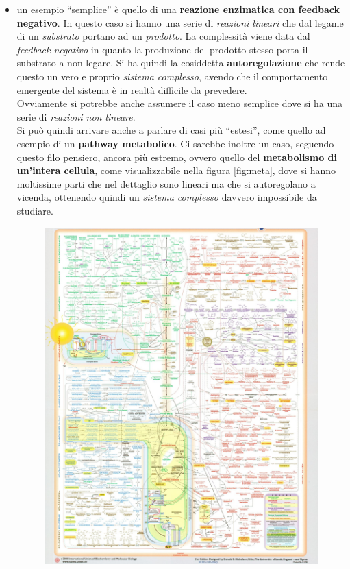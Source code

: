 \documentclass[a4paper,12pt, oneside]{book}
\begin{document}
\begin{itemize}
  \item un esempio ``semplice'' è quello di una \textbf{reazione enzimatica con
    feedback negativo}. In questo caso si hanno una serie di \textit{reazioni
    lineari} che dal legame di un \textit{substrato} portano ad un
  \textit{prodotto}. La complessità viene data dal \textit{feedback negativo} in
  quanto la produzione del prodotto stesso porta il substrato a non  legare. Si
  ha quindi la cosiddetta \textbf{autoregolazione} che rende questo un vero e
  proprio \textit{sistema complesso}, avendo che il comportamento emergente del
  sistema è in realtà difficile da prevedere.\\
  Ovviamente si potrebbe anche assumere il caso meno semplice dove si ha una
  serie di \textit{reazioni non lineare}. \\
  Si può quindi arrivare anche a parlare di casi più ``estesi'', come quello ad
  esempio di un \textbf{pathway metabolico}. Ci sarebbe inoltre un caso,
  seguendo questo filo pensiero, ancora più estremo, ovvero quello del
  \textbf{metabolismo di un'intera cellula}, come visualizzabile nella figura
  \ref{fig:meta}, dove si hanno moltissime parti che 
  nel dettaglio sono lineari ma che si autoregolano a vicenda, ottenendo quindi
  un \textit{sistema complesso} davvero impossibile da studiare.
  \begin{figure}
    \centering
    \includegraphics[width = \textwidth]{img/metabolome.jpg}

\end{figure}
\end{itemize}
\end{document}
